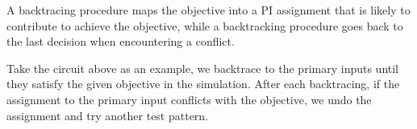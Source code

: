 
A backtracing procedure maps the objective into a PI assignment that is likely to contribute to achieve the objective, while a backtracking procedure goes back to the last decision when encountering a conflict.

Take the circuit above as an example, we backtrace to the primary inputs until they satisfy the given objective in the simulation. After each backtracing, if the assignment to the primary input conflicts with the objective, we undo the assignment and try another test pattern.
